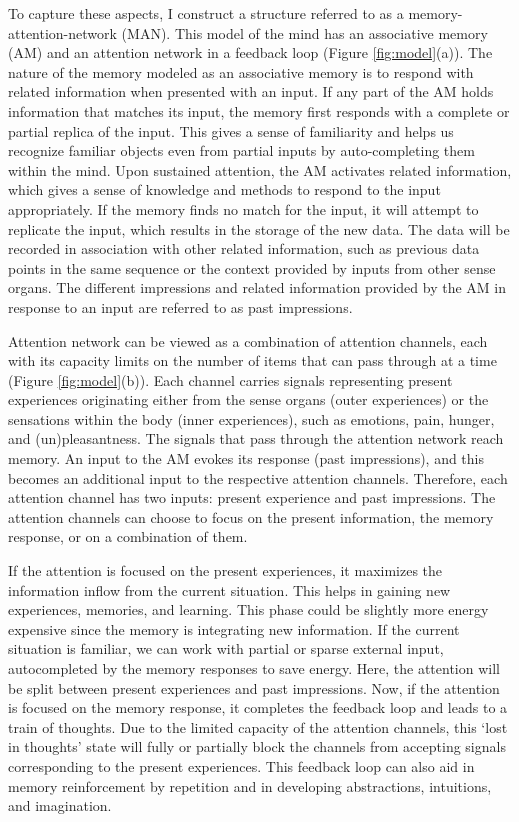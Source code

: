 \documentclass[reprint,amsmath,amssymb,apr,aip,onecolumn, 11pt]{revtex4-1}
\begin{document}
	To capture these aspects, I construct a structure referred to as a memory-attention-network (MAN). This model of the mind has an associative memory (AM) and an attention network in a feedback loop (Figure \ref{fig:model}(a)). The nature of the memory modeled as an associative memory is to respond with related information when presented with an input. If any part of the AM holds information that matches its input, the memory first responds with a complete or partial replica of the input. This gives a sense of familiarity and helps us recognize familiar objects even from partial inputs by auto-completing them within the mind. Upon sustained attention, the AM activates related information, which gives a sense of knowledge and methods to respond to the input appropriately. If the memory finds no match for the input, it will attempt to replicate the input, which results in the storage of the new data. The data will be recorded in association with other related information, such as previous data points in the same sequence or the context provided by inputs from other sense organs. The different impressions and related information provided by the AM in response to an input are referred to as past impressions.     
%		
		
		 Attention network can be viewed as a combination of attention channels, each with its capacity limits on the number of items that can pass through at a time (Figure \ref{fig:model}(b)). Each channel carries signals representing present experiences originating either from the sense organs (outer experiences) or the sensations within the body (inner experiences), such as emotions,  pain, hunger, and (un)pleasantness. The signals that pass through the attention network reach memory. An input to the AM evokes its response (past impressions), and this becomes an additional input to the respective attention channels. Therefore, each attention channel has two inputs: present experience and past impressions. The attention channels can choose to focus on the present information, the memory response, or on a combination of them. 
		 
		 
		 If the attention is focused on the present experiences, it maximizes the information inflow from the current situation. This helps in gaining new experiences, memories, and learning. This phase could be slightly more energy expensive since the memory is integrating new information. If the current situation is familiar, we can work with partial or sparse external input, autocompleted by the memory responses to save energy. Here, the attention will be split between present experiences and past impressions.  Now, if the attention is focused on the memory response, it completes the feedback loop and leads to a train of thoughts. Due to the limited capacity of the attention channels, this `lost in thoughts' state will fully or partially block the channels from accepting signals corresponding to the present experiences. This feedback loop can also aid in memory reinforcement by repetition and in developing abstractions, intuitions, and imagination.   
\end{document}
